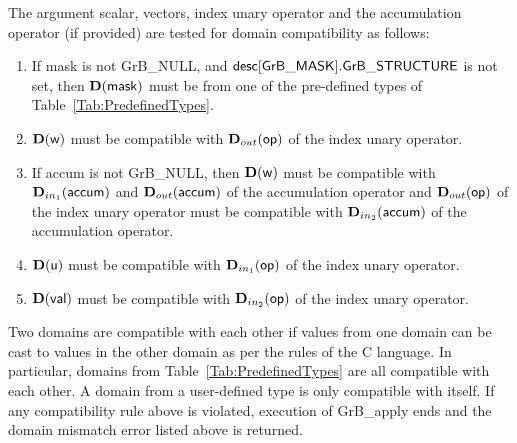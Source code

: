 {\color{red}
The argument scalar, vectors, index unary operator and the accumulation 
operator (if provided) are tested for domain compatibility as follows:
\begin{enumerate}
    \item If {\sf mask} is not {\sf GrB\_NULL}, and ${\sf desc[GrB\_MASK].GrB\_STRUCTURE}$
    is not set, then $\bold{D}({\sf mask})$ must be from one of the pre-defined types of 
    Table~\ref{Tab:PredefinedTypes}.

    \item $\bold{D}({\sf w})$ must be compatible with $\mbox{$\mathbf{D}_{out}$}({\sf op})$ of the index unary operator.

    \item If {\sf accum} is not {\sf GrB\_NULL}, then $\bold{D}({\sf w})$ must be
    compatible with $\mbox{$\mathbf{D}_{in_{1}}$}({\sf accum})$ and $\mbox{$\mathbf{D}_{out}$}({\sf accum})$ of the accumulation operator and 
    $\mbox{$\mathbf{D}_{out}$}({\sf op})$ of the index unary operator must be compatible with $\mbox{$\mathbf{D}_{in_{2}}$}({\sf accum})$ of the accumulation operator.

    \item $\bold{D}({\sf u})$ must be compatible with $\mbox{$\mathbf{D}_{in_{1}}$}({\sf op})$ of the index unary operator.
    
    \item $\bold{D}({\sf val})$ must be compatible with $\mbox{$\mathbf{D}_{in_{2}}$}({\sf op})$ of the index unary operator.
\end{enumerate}
}
Two domains are compatible with each other if values from one domain can be cast 
to values in the other domain as per the rules of the C language.
In particular, domains from Table~\ref{Tab:PredefinedTypes} are all compatible 
with each other. A domain from a user-defined type is only compatible with itself.
If any compatibility rule above is violated, execution of {\sf GrB\_apply} ends
and the domain mismatch error listed above is returned.

